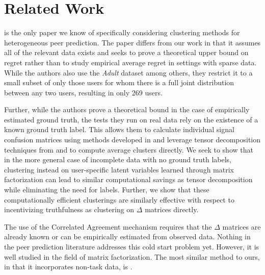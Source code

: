 \documentclass{article}
\begin{document}
\section{Related Work}


\citep{agarwal2017} is the only paper we know of specifically considering clustering methods for heterogeneous peer prediction. The paper differs from our work in that it assumes all of the relevant data exists and seeks to prove a theoretical upper bound on regret rather than to study empirical average regret in settings with sparse data. While the authors also use the \emph{Adult} dataset among others, they restrict it to a small subset of only those users for whom there is a full joint distribution between any two users, resulting in only 269 users. 

Further, while the authors prove a theoretical bound in the case of empirically estimated ground truth, the tests they run on real data rely on the existence of a known ground truth label. This allows them to calculate individual signal confusion matrices using methods developed in \citet{dawid1979maximum} and leverage tensor decomposition techniques from \citet{anandkumar2014tensor} and \citet{zhang2016spectral} to compute average clusters directly. We seek to show that in the more general case of incomplete data with no ground truth labels, clustering instead on user-specific latent variables learned through matrix factorization can lead to similar computational savings as tensor decomposition while eliminating the need for labels.  Further, we show that these computationally efficient clusterings are similarly effective with respect to incentivizing truthfulness as clustering on $\Delta$ matrices directly.

The use of the Correlated Agreement mechanism \citep{shnayder2016informed} requires that the $\Delta$ matrices are already known or can be empirically estimated from observed data. Nothing in the peer prediction literature addresses this cold start problem yet. However, it is well studied in the field of matrix factorization. The most similar method to ours, in that it incorporates non-task data, is \citep{kula2015metadata}.
\end{document}
